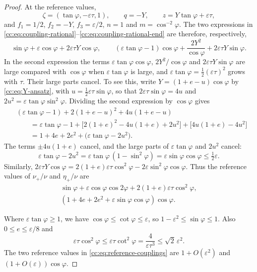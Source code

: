 \begin{proof}
At the reference values,
\[
 \zeta=(\tan\varphi,-\varepsilon\tau,1),\qquad
 q=-Y,\qquad z=Y\tan\varphi+\varepsilon\tau,
\]
and $f_1=1/2$, $f_2=-Y$, $f_3=\varepsilon/2$, $n=1$ and
$m=\cos^{-2}\varphi$. The two expressions in
\eqref{cc:eq:coupling-rational}--\eqref{cc:eq:coupling-rational-end}
are therefore, respectively,
\[
 \sin\varphi+\varepsilon\cos\varphi+2\varepsilon\tau Y\cos\varphi,
 \qquad
 (\varepsilon\tan\varphi-1)\cos\varphi
    +\frac{2Y^2}{\cos\varphi}+2\varepsilon\tau Y\sin\varphi.
\]
In the second expression the terms $\varepsilon\tan\varphi\cos\varphi$,
$2Y^2/\cos\varphi$ and $2\varepsilon\tau Y\sin\varphi$ are large compared
with $\cos\varphi$ when $\varepsilon\tan\varphi$ is large, and
$\varepsilon\tan\varphi=\tfrac12(\varepsilon\tau)^2$ grows with $\tau$.
Their large parts cancel. To see this, write $Y=(1+e-u)\cos\varphi$
by \eqref{cc:eq:Y-ansatz}, with $u=\tfrac12\varepsilon\tau\sin\varphi$,
so that $2\varepsilon\tau\sin\varphi=4u$ and
$2u^2=\varepsilon\tan\varphi\sin^2\varphi$. Dividing the second
expression by $\cos\varphi$ gives
\begin{align*}
 &(\varepsilon\tan\varphi-1)+2(1+e-u)^2+4u(1+e-u)\\
 &\qquad=\varepsilon\tan\varphi-1
   +\bigl[2(1+e)^2-4u(1+e)+2u^2\bigr]+\bigl[4u(1+e)-4u^2\bigr]\\
 &\qquad=1+4e+2e^2+\bigl(\varepsilon\tan\varphi-2u^2\bigr).
\end{align*}
The terms $\pm4u(1+e)$ cancel, and the large parts of
$\varepsilon\tan\varphi$ and $2u^2$ cancel:
\[
 \varepsilon\tan\varphi-2u^2=\varepsilon\tan\varphi\,(1-\sin^2\varphi)
 =\varepsilon\sin\varphi\cos\varphi\le\tfrac12\varepsilon .
\]
Similarly,
$2\varepsilon\tau Y\cos\varphi
=2(1+e)\varepsilon\tau\cos^2\varphi
 -2\varepsilon\sin^2\varphi\cos\varphi$.
Thus the reference values of $\nu_+/\nu$ and $\eta_+/\nu$ are
\begin{equation}\label{cc:eq:reference-couplings}
 \begin{gathered}
 \sin\varphi+\varepsilon\cos\varphi\cos2\varphi
                   +2(1+e)\varepsilon\tau\cos^2\varphi,\\
 (1+4e+2e^2+\varepsilon\sin\varphi\cos\varphi)\cos\varphi.
 \end{gathered}
\end{equation}

Where $\varepsilon\tan\varphi\ge1$, we have $\cos\varphi\le\cot\varphi\le\varepsilon$, so
$1-\varepsilon^2\le\sin\varphi\le1$. Also $0\le e\le\varepsilon/8$ and
\[
 \varepsilon\tau\cos^2\varphi
 \le\varepsilon\tau\cot^2\varphi
 =\frac4{\varepsilon\tau^3}\le\sqrt2\,\varepsilon^2.
\]
The two reference values in \eqref{cc:eq:reference-couplings} are
$1+O(\varepsilon^2)$ and $(1+O(\varepsilon))\cos\varphi$.


\end{proof}
